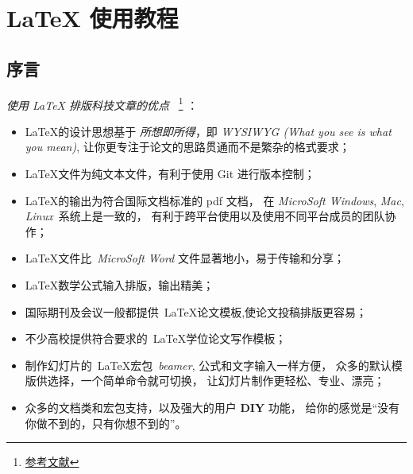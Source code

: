 \documentclass[
    11pt,
    cite=authoryear,
    device=normal,
    lang=cn,
    mode=simple,
    result=answer,
    toc=onecol,
]{elegantbook_sierxue}
\begin{document}
%

\chapter{\LaTeX{} 使用教程}%
\label{cha:latex-tips}

\section*{序言}%
\label{sec:latex-intro}

\emph{使用 {\rm\LaTeX{}} 排版科技文章的优点}
~\footnote{\href{https://github.com/HymanHuang/plutothesis/tree/master/PlutoKaiTi/a4paper}{参考文献}}
：
\begin{itemize}
    \item \LaTeX{}的设计思想基于 \emph{所想即所得}，即 \emph{WYSIWYG
        (What you see is what you mean)},
        让你更专注于论文的思路贯通而不是繁杂的格式要求；
    \item \LaTeX 文件为纯文本文件，有利于使用 Git 进行版本控制；
    \item \LaTeX 的输出为符合国际文档标准的 pdf 文档，
        在 \emph{MicroSoft Windows},
        \emph{Mac}, \emph{Linux}~系统上是一致的，
        有利于跨平台使用以及使用不同平台成员的团队协作；
    \item \LaTeX 文件比~\emph{MicroSoft Word} 文件显著地小，易于传输和分享；
    \item \LaTeX 数学公式输入排版，输出精美；
    \item 国际期刊及会议一般都提供~\LaTeX 论文模板,使论文投稿排版更容易；
    \item 不少高校提供符合要求的~\LaTeX{}学位论文写作模板；
    \item 制作幻灯片的~\LaTeX 宏包~\emph{beamer}, 公式和文字输入一样方便，
        众多的默认模版供选择，一个简单命令就可切换，
        让幻灯片制作更轻松、专业、漂亮；
    \item  众多的文档类和宏包支持，以及强大的用户 {\bf DIY} 功能，
          给你的感觉是``没有你做不到的，只有你想不到的''。
\end{itemize}
\end{document}
